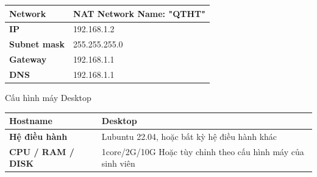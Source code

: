 \documentclass[a4paper, 11pt]{article}
\begin{document}
\begin{itemize}
\begin{minipage}{\linewidth}
\begin{multicols}{2}
\begin{minipage}{\linewidth}
\begin{tabular}{| p{.4\linewidth} | p{.4\linewidth} |}
                          \textbf{Network}          & NAT Network \newline Name: "QTHT"                                    \\
                          \hline

                          \textbf{IP}               & 192.168.1.2                                                          \\
                          \hline

                          \textbf{Subnet mask}      & 255.255.255.0                                                        \\
                          \hline

                          \textbf{Gateway}          & 192.168.1.1                                                          \\
                          \hline

                          \textbf{DNS}              & 192.168.1.1                                                          \\
                          \hline
                      \end{tabular}
                  \end{minipage}

                  \begin{minipage}{\linewidth}
                      \captionsetup{type=table}
                      \caption{Cấu hình máy Desktop}
                      \centering
                      \begin{tabular}{| p{.4\linewidth} | p{.5\linewidth} |}
                          \hline
                          \textbf{Hostname}                                              & Desktop                                                              \\
                          \hline

                          \textbf{Hệ điều hành}                                          & Lubuntu 22.04, \newline hoặc bất kỳ hệ điều hành khác                \\
                          \hline

                          \textbf{CPU / RAM / DISK}                                      & 1core/2G/10G \newline Hoặc tùy chỉnh theo cấu hình máy của sinh viên \\
                          \hline


\end{tabular}
\end{minipage}
\end{multicols}
\end{minipage}
\end{itemize}
\end{document}
